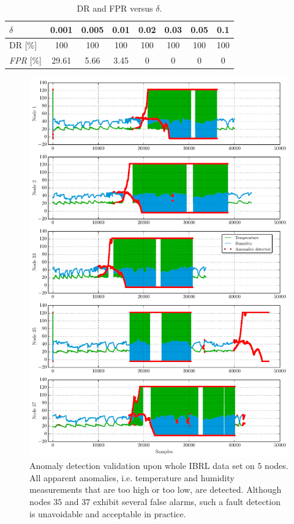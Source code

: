 \documentclass[conference]{IEEEtran}
\theoremstyle{problemstyle}
\begin{document}
\begin{table}
\begin{tabular}{lccccccc}
\toprule
$\delta$ & 0.001 & 0.005 & 0.01 & 0.02 & 0.03 & 0.05 & 0.1 \\\midrule[\lightrulewidth]
DR [\%] & 100 & 100 & 100 & 100 & 100 & 100 & 100 \\
\emph{FPR} [\%] & 29.61 & 5.66 & 3.45 & 0 & 0 & 0 &0 \\\bottomrule
\end{tabular}
\caption{DR and FPR versus $\delta$.}
\label{table:delta_eval}
\end{table}

\begin{figure}
\centering
\includegraphics[scale=.7]{Figs/time_validation.pdf}
\caption{Anomaly detection validation upon whole IBRL data set on $5$ nodes. All apparent anomalies, i.e. temperature and humidity measurements that are too high or too low, are detected. Although nodes $35$ and $37$ exhibit several false alarms, such a fault detection is unavoidable and acceptable in practice.}
\label{fig:time_valid}
\end{figure}
\end{document}
